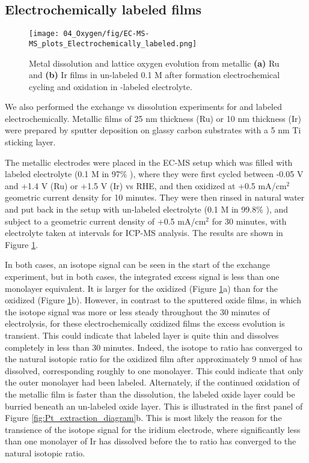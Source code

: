 \subsection{Electrochemically labeled films}

\begin{figure}
	\texttt{[image: 04\_Oxygen/fig/EC-MS-MS\_plots\_Electrochemically\_labeled.png]}
	\caption{Metal dissolution and lattice oxygen evolution from metallic \textbf{(a)} Ru and \textbf{(b)} Ir films in un-labeled 0.1 M  after formation electrochemical cycling and oxidation in -labeled electrolyte.
			}
	\label{fig:EC-MS-MS_EC}
\end{figure}

We also performed the exchange vs dissolution experiments for  and  labeled electrochemically. Metallic films of 25 nm thickness (Ru) or 10 nm thickness (Ir) were prepared by sputter deposition on glassy carbon substrates with a 5 nm Ti sticking layer.

The metallic electrodes were placed in the EC-MS setup which was filled with labeled electrolyte (0.1 M  in 97\% ), where they were first cycled between -0.05 V and +1.4 V (Ru) or +1.5 V (Ir) vs RHE, and then oxidized at +0.5 mA/cm$^2$ geometric current density for 10 minutes. They were then rinsed in natural water and put back in the setup with un-labeled electrolyte (0.1 M  in 99.8\% ), and subject to a geometric current density of +0.5 mA/cm$^2$ for 30 minutes, with electrolyte taken at intervals for ICP-MS analysis. The results are shown in Figure \ref{fig:EC-MS-MS_EC}.

In both cases, an isotope signal can be seen in the start of the exchange experiment, but in both cases, the integrated excess  signal is less than one monolayer equivalent. It is larger for the oxidized  (Figure \ref{fig:EC-MS-MS_EC}a) than for the oxidized  (Figure \ref{fig:EC-MS-MS_EC}b). However, in contrast to the sputtered oxide films, in which the isotope signal was more or less steady throughout the 30 minutes of electrolysis, for these electrochemically oxidized films the excess  evolution is transient. This could indicate that labeled layer is quite thin and dissolves completely in less than 30 minutes. Indeed, the isotope  to  ratio has converged to the natural isotopic ratio for the oxidized  film after approximately 9 nmol of  has dissolved, corresponding roughly to one monolayer. This could indicate that only the outer monolayer had been labeled. Alternately, if the continued oxidation of the metallic film is faster than the dissolution, the labeled oxide layer could be burried beneath an un-labeled oxide layer. This is illustrated in the first panel of Figure \ref{fig:Pt_extraction_diagram}b. This is most likely the reason for the transience of the isotope signal for the iridium electrode, where significantly less than one monolayer of Ir has dissolved before the  to  ratio has converged to the natural isotopic ratio.

